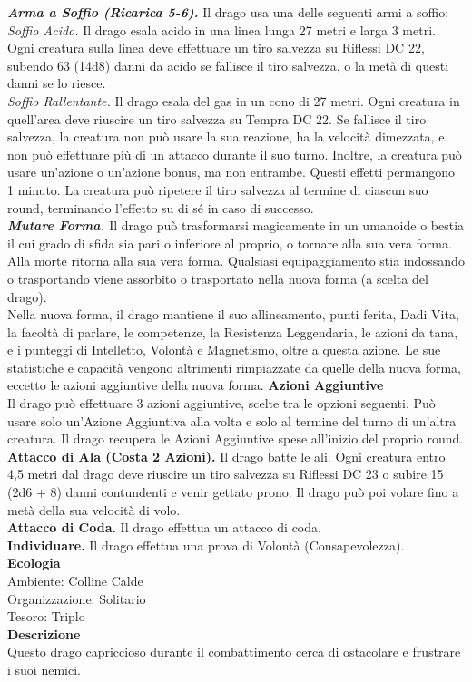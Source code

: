 \begin{multicols}{2}
\emph{\textbf{Arma a Soffio (Ricarica 5-6).}} Il drago usa una delle seguenti armi a soffio:\\
\emph{Soffio Acido.} Il drago esala acido in una linea lunga 27 metri e larga 3 metri. Ogni creatura sulla linea deve effettuare un tiro salvezza su Riflessi DC 22, subendo 63 (14d8) danni da acido se fallisce il tiro salvezza, o la metà di questi danni se lo riesce.\\
\emph{Soffio Rallentante.} Il drago esala del gas in un cono di 27 metri. Ogni creatura in quell'area deve riuscire un tiro salvezza su Tempra DC 22. Se fallisce il tiro salvezza, la creatura non può usare la sua reazione, ha la velocità dimezzata, e non può effettuare più di un attacco durante il suo turno. Inoltre, la creatura può usare un'azione o un'azione bonus, ma non entrambe. Questi effetti permangono 1 minuto. La creatura può ripetere il tiro salvezza al termine di ciascun suo round, terminando l'effetto su di sé in caso di successo.\\
\emph{\textbf{Mutare Forma.}} Il drago può trasformarsi magicamente in un umanoide o bestia il cui grado di sfida sia pari o inferiore al proprio, o tornare alla sua vera forma. Alla morte ritorna alla sua vera forma. Qualsiasi equipaggiamento stia indossando o trasportando viene assorbito o trasportato nella nuova forma (a scelta del drago). \\
Nella nuova forma, il drago mantiene il suo allineamento, punti ferita, Dadi Vita, la facoltà di parlare, le competenze, la Resistenza Leggendaria, le azioni da tana, e i punteggi di Intelletto, Volontà e Magnetismo, oltre a questa azione. Le sue statistiche e capacità  vengono altrimenti rimpiazzate da quelle della nuova forma, eccetto le azioni aggiuntive della nuova forma.
\textbf{Azioni Aggiuntive}\\
Il drago può effettuare 3 azioni aggiuntive, scelte tra le opzioni seguenti. Può usare solo un'Azione Aggiuntiva alla volta e solo al termine del turno di un'altra creatura. Il drago recupera le Azioni Aggiuntive spese all'inizio del proprio round.\\
\textbf{Attacco di Ala (Costa 2 Azioni).} Il drago batte le ali. Ogni creatura entro 4,5 metri dal drago deve riuscire un tiro salvezza su Riflessi DC 23 o subire 15 (2d6 + 8) danni contundenti e venir gettato prono. Il drago può poi volare fino a metà della sua velocità di volo.\\
\textbf{Attacco di Coda.} Il drago effettua un attacco di coda.\\
\textbf{Individuare.} Il drago effettua una prova di Volontà (Consapevolezza).\\
\textbf{Ecologia}\\
Ambiente: Colline Calde\\
Organizzazione: Solitario\\
Tesoro: Triplo\\
\textbf{Descrizione}\\
Questo drago capriccioso durante il combattimento cerca di ostacolare e frustrare i suoi nemici.\\


\end{multicols}
